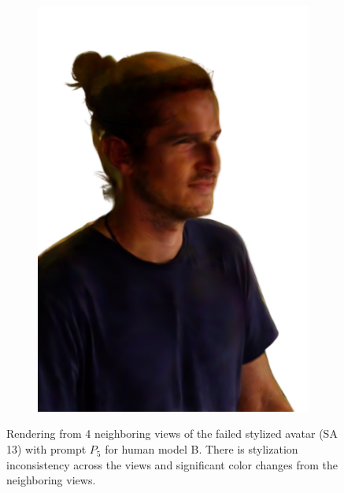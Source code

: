 \begin{figure}[ht]
\begin{subfigure}{0.2\linewidth}
		\includegraphics[width=\textwidth]{Figures/failed/cowboy/18_render-removebg-preview.png}
	\end{subfigure}
	\caption{Rendering from 4 neighboring views of the failed stylized avatar (SA 13) with prompt $P_5$ for human model B. There is stylization inconsistency across the views and significant color changes from the neighboring views.}
	\label{fig:failed_cowboy}
\end{figure}

